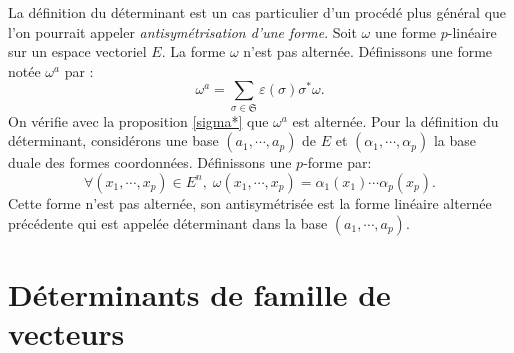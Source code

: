 La définition du déterminant est un cas particulier d'un procédé plus général que l'on pourrait appeler \emph{antisymétrisation d'une forme}.\newline
Soit $\omega$ une forme $p$-linéaire sur un espace vectoriel $E$. La forme $\omega$ n'est pas alternée. Définissons une forme notée $\omega^a$ par :
\[
 \omega^a = \sum_{\sigma \in \mathfrak{S}} \varepsilon(\sigma) \sigma^* \omega.
\]
On vérifie avec la proposition \ref{sigma*} que $\omega^a$ est alternée.
Pour la définition du déterminant, considérons une base $(a_1, \cdots, a_p)$ de $E$ et $(\alpha_1, \cdots, \alpha_p)$ la base duale des formes coordonnées. Définissons une $p$-forme par:
\[
 \forall (x_1, \cdots, x_p) \in E^n, \; \omega(x_1,\cdots,x_p) = \alpha_1(x_1) \cdots \alpha_p(x_p).
\]
Cette forme n'est pas alternée, son antisymétrisée est la forme linéaire alternée précédente qui est appelée déterminant dans la base $(a_1, \cdots, a_p)$.


\section{Déterminants de famille de vecteurs}

